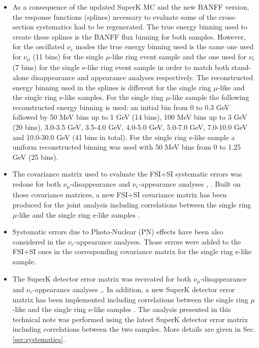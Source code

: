 \begin{itemize}
\item{As a consequence of the updated SuperK MC and the new BANFF version, the response functions (splines) necessary to evaluate some of the cross-section systematics had to be regenerated. The true energy binning used to create these splines is the BANFF flux binning for both samples. However, for the oscillated $\nu_{e}$ modes the true energy binning used is the same one used for $\nu_{\mu}$ (11 bins) for the single $\mu$-like ring event sample and the one used for $\nu_{e}$ (7 bins) for the single e-like ring event sample in order to match both stand-alone disappearance and appearance analyses respectively. The reconstructed energy binning used in the splines is different for the single ring $\mu$-like and the single ring e-like samples. For the single ring $\mu$-like sample the following reconstructed energy binning is used: an initial bin from 0 to 0.3 GeV followed by 50 MeV bins up to 1 GeV (14 bins), 100 MeV bins up to 3 GeV (20 bins), 3.0-3.5 GeV, 3.5-4.0 GeV, 4.0-5.0 GeV, 5.0-7.0 GeV, 7.0-10.0 GeV and 10.0-30.0 GeV (41 bins in total). For the single ring e-like sample a uniform reconstructed binning was used with 50 MeV bins from 0 to 1.25 GeV  (25 bins). }


\item{The covariance matrix used to evaluate the FSI+SI systematic errors was redone for both $\nu_{\mu}$-disappearance and $\nu_{e}$-appearance analyses \cite{OurRun1234DisappAnalysis3Flavour}, \cite{2013nuenergy}. Built on those covariance matrices, a new FSI+SI covariance matrix has been produced for the joint analysis including correlations between the single ring $\mu$-like and the single ring e-like samples \cite{ikeda}.}

\item{Systematic errors due to Photo-Nuclear (PN) effects have been also considered in the $\nu_{e}$-appearance analyses. Those errors were added to the FSI+SI ones in the corresponding covariance matrix for the single ring e-like sample. }

\item{The SuperK detector error matrix was recreated for both $\nu_{\mu}$-disappearance and $\nu_{e}$-appearance analyses \cite{SuperkErrors2013},\cite{SuperkErrorsNuE2013}. In addition, a new SuperK detector error matrix has been implemented including correlations between the single ring $\mu$-like and the single ring e-like samples \cite{fi}. The analysis presented in this technical note was performed using the latest SuperK detector error matrix including correlations between the two samples. More details are given in Sec. \ref{sec:systematics}.}


\end{itemize}
